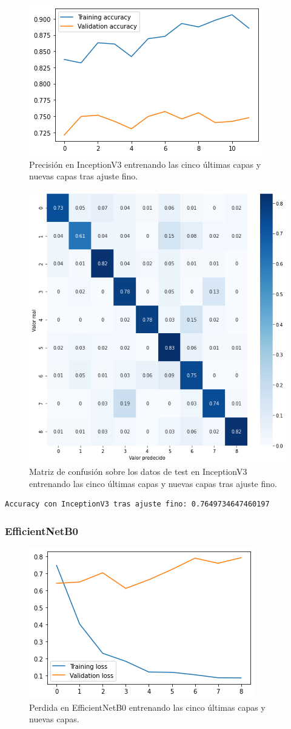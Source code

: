 \begin{figure}[H]
  \centering
  \includegraphics[width=0.5\linewidth]{Imagenes/entrenamiento_redes/5-ult/inception_5fine_acc.png}
  \caption{Precisión en InceptionV3 entrenando las cinco últimas capas y nuevas capas tras ajuste fino.}
\end{figure}

\begin{figure}[H]
  \centering
  \includegraphics[width=0.5\linewidth]{Imagenes/entrenamiento_redes/5-ult/inception_5fine_matriz.png}
  \caption{Matriz de confusión sobre los datos de test en InceptionV3 entrenando las cinco últimas capas y nuevas capas tras ajuste fino.}
\end{figure}


\begin{lstlisting}
Accuracy con InceptionV3 tras ajuste fino: 0.7649734647460197
\end{lstlisting}



\subsubsection{EfficientNetB0}


\begin{figure}[H]
  \centering
  \includegraphics[width=0.5\linewidth]{Imagenes/entrenamiento_redes/5-ult/efficientnet_5ult_loss.png}
  \caption{Perdida en EfficientNetB0 entrenando las cinco últimas capas y nuevas capas.}
\end{figure}

